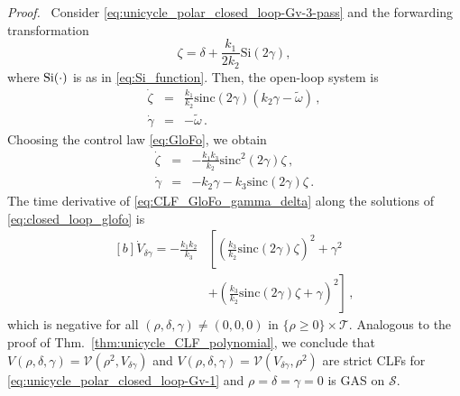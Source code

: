 \documentclass[journal,twoside,web]{ieeecolor}
\theoremstyle{definition}
\renewenvironment{proof}[1][Proof]{\par\pushQED{\qed}\normalfont\textit{#1.}~}{\popQED\par}
\begin{document}
\begin{proof}
Consider \eqref{eq:unicycle_polar_closed_loop-Gv-3-pass} and the 
forwarding transformation
\begin{equation}
\zeta =\delta+ \dfrac{k_1}{2k_2}\mbox{Si}(2\gamma), 
\end{equation} where ${\rm Si}(\cdot)$ is as in \eqref{eq:Si_function}.
Then, the open-loop system is
\begin{eqnarray}
\dot\zeta &=& \frac{k_1}{k_2}\mbox{sinc}(2\gamma)(k_2\gamma -\tilde\omega) \,,
\\
\dot\gamma &=& - \tilde\omega\,.
\end{eqnarray}
Choosing the control law \eqref{eq:GloFo}, we obtain
\begin{subequations}
\label{eq:closed_loop_glofo}
\begin{eqnarray}
\dot\zeta &=& -\frac{k_1k_3}{k_2}\mbox{sinc}^2(2
\gamma) \zeta \,,
\\
\dot\gamma &=& - k_2\gamma - k_3\mbox{sinc}(2\gamma)\zeta\,.
\end{eqnarray}
\end{subequations}
The time derivative of \eqref{eq:CLF_GloFo_gamma_delta}
along the solutions of \eqref{eq:closed_loop_glofo} is
\begin{equation}
\begin{aligned}[b]
\dot V_{\delta \gamma}  =- \frac{k_1k_2}{k_3}& \left[
\left(\frac{k_3}{k_2}\mbox{sinc}(2\gamma) \zeta\right)^2 +\gamma^2 \right.  \\ &\left. + \left(\frac{k_3}{k_2}\mbox{sinc}(2\gamma) \zeta +\gamma \right)^2 \label{eq:V_dot_forward1}
\right]\,,
\end{aligned}
\end{equation}
which is negative for all $(\rho,\delta,\gamma) \ne (0,0,0)$ in $\{\rho \ge 0\} \times \mathcal{T}$.
Analogous to the proof of Thm.~\ref{thm:unicycle_CLF_polynomial}, we conclude that $V(\rho, \delta, \gamma) = \mathcal{V}(\rho^2, V_{\delta \gamma})$ and $V(\rho, \delta, \gamma) = \mathcal{V}(V_{\delta \gamma},\rho^2)$ are strict CLFs for \eqref{eq:unicycle_polar_closed_loop-Gv-1} and  %
$\rho =  \delta = \gamma = 0$ is GAS on $\mathcal{S}$.
\end{proof}
\end{document}
